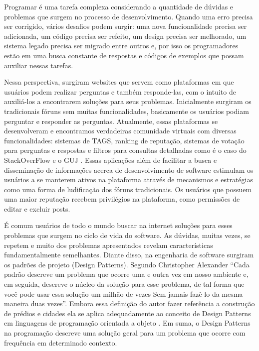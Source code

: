 Programar é uma tarefa complexa considerando a quantidade de dúvidas e problemas que surgem no processo de desenvolvimento. 
Quando uma erro precisa ser corrigido,  vários desafios podem surgir: uma nova funcionalidade precisa ser adicionada, um código precisa 
ser refeito, um design precisa ser melhorado, um sistema legado precisa ser migrado entre outros e, por isso os programadores estão em 
uma busca constante de respostas e códigos de exemplos que possam auxiliar nessas tarefas.

Nessa perspectiva, surgiram websites que servem como plataformas em que usuários podem realizar perguntas e também responde-las, 
com o intuito de auxiliá-los a encontrarem soluções para seus problemas. Inicialmente surgiram os tradicionais fóruns sem muitas  funcionalidades,
 basicamente os usuários podiam perguntar e responder as perguntas. Atualmente, essas plataformas se desenvolveram e encontramos verdadeiras
comunidade virtuais com diversas funcionalidades: sistemas de TAGS, ranking de reputação, sistemas de votação para perguntas e respostas e  
filtros para consultas detalhadas como é o caso do StackOverFlow \cite{stack} e o GUJ \cite{guj}. Essas aplicações além de facilitar a busca e disseminação 
de informações acerca de desenvolvimento de software estimulam os usuários a se manterem ativos na plataforma através de mecanismos e estratégias
como uma forma de ludificação dos fóruns tradicionais. Os usuários que possuem uma maior reputação recebem privilégios na plataforma, como permissões de editar e excluir posts.

É comum usuários de todo o mundo buscar na internet soluções para esses problemas que surgem no ciclo de vida do software. As dúvidas,
muitas vezes, se repetem e muito dos problemas apresentados revelam  características fundamentalmente semelhantes. Diante disso, na engenharia
 de software surgiram os padrões de projeto (Design Patterns). Segundo Christopher Alexander “Cada padrão descreve um problema que ocorre uma 
e outra vez em nosso ambiente e, em seguida, descreve o núcleo da solução para esse problema, de tal forma que você pode usar essa solução um milhão
de vezes Sem jamais fazê-lo da mesma maneira duas vezes”\cite{gamma1995design}. Embora essa definição do autor fazer referência a construção 
de prédios e cidades ela se aplica adequadamente ao conceito de Design Patterns em linguagens de programação orientada a objeto \cite{alexander1977pattern}. 
Em suma, o Design Patterns na programação descreve uma solução geral para um problema que ocorre com frequência em determinado contexto.

